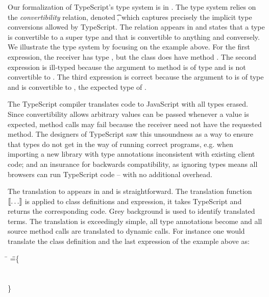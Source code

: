 \documentclass[acmlarge, anonymous, authordraft, review]{acmart} %
\begin{document}
\medskip

\noindent
Our formalization of TypeScript's type system is in
. The type system relies on the \emph{convertibility}
relation, denoted \ConvertE{}\t\tp, which captures precisely the implicit
type conversions allowed by TypeScript.  The relation appears in
 and states that a type is convertible to a super type and
that \any is convertible to anything and conversely. We illustrate the type
system by focusing on the example above. For the first expression, the
receiver has type \C, but the class does have method \n. The second
expression is ill-typed because the argument to method \m is of type \C and
\C is not convertible to \D. The third expression is correct because the
argument to \mp is of type \C and \C is convertible to \any, the expected
type of \mp.

The TypeScript compiler translates code to JavaScript with all types erased.
Since convertibility allows arbitrary values can be passed whenever a \any
value is expected, method calls may fail because the receiver need not have
the requested method. The designers of TypeScript saw this unsoundness as a
way to ensure that types do not get in the way of running correct programs,
e.g. when importing a new library with type annotations inconsistent with
existing client code; and an insurance for backwards compatibility, as
ignoring types means all browsers can run TypeScript code -- with no
additional overhead.

The translation to \kafka appears in  and is straightforward.
The translation function \(\llbracket \dots \rrbracket\) is applied to class definitions and
expression, it takes TypeScript and returns the corresponding \kafka
code. Grey background is used to identify translated terms. The translation
is exceedingly simple, all type annotations become \any and all source
method calls are translated to dynamic \kafka calls.  For instance one would
translate the class definition and the last expression of the example above as:

\medskip
{\small
\begin{tabbing}
  \hspace{.2cm}
   \= \DynCall{(\SubCast\any{\New\C{}})}\m{\DynCall{(\SubCast\any{\New\C{}})}\n{\New\C{}}} \HS\HS\HS\HS\HS\HS\HS\HS\HS\WHERE\HS \K\HS =\HS\= \class\= \C \{\\
   \>                                   \>  \>  \Mdef\m\x\any\any{~\SubCast\any\this~} \\
   \>              \>  \>  \Mdef\mp\x\any\any{~\x~}\\
   \>                                                              \>  \}   
\end{tabbing}}
\medskip
\end{document}
